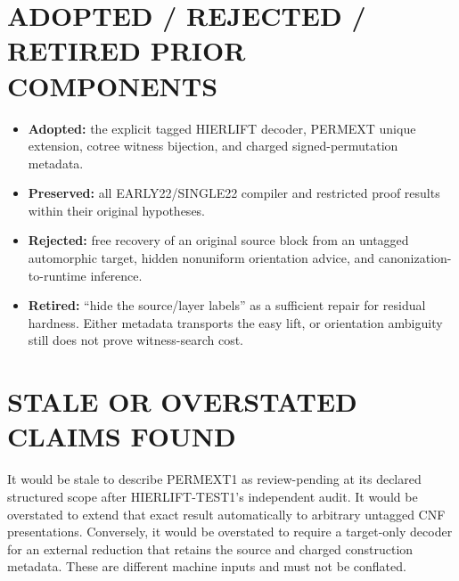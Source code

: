 \documentclass[11pt]{article}
\begin{document}
\section{ADOPTED / REJECTED / RETIRED PRIOR COMPONENTS}
\begin{itemize}
\item \textbf{Adopted:} the explicit tagged HIERLIFT decoder, PERMEXT unique
extension, cotree witness bijection, and charged signed-permutation metadata.
\item \textbf{Preserved:} all EARLY22/SINGLE22 compiler and restricted proof
results within their original hypotheses.
\item \textbf{Rejected:} free recovery of an original source block from an
untagged automorphic target, hidden nonuniform orientation advice, and
canonization-to-runtime inference.
\item \textbf{Retired:} ``hide the source/layer labels'' as a sufficient
repair for residual hardness.  Either metadata transports the easy lift, or
orientation ambiguity still does not prove witness-search cost.
\end{itemize}

\section{STALE OR OVERSTATED CLAIMS FOUND}
It would be stale to describe PERMEXT1 as review-pending at its declared
structured scope after HIERLIFT-TEST1's independent audit.  It would be
overstated to extend that exact result automatically to arbitrary untagged
CNF presentations.  Conversely, it would be overstated to require a
target-only decoder for an external reduction that retains the source and
charged construction metadata.  These are different machine inputs and must
not be conflated.
\end{document}
